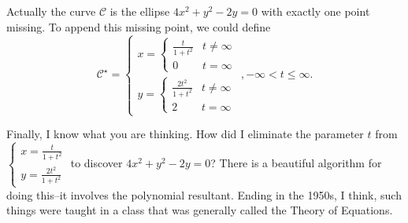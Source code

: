 \documentclass[12pt,answers,fleqn]{exam}
\begin{document}
\begin{questions}
\begin{parts}
\begin{solution}[3.5in]
\quad Actually the curve $\mathcal{C}$ is the ellipse $4 x^2 + y^2 - 2 y = 0$
with exactly one point missing.  To append this missing point, we could define
\begin{equation*}
  \mathcal{C}^\star = 
  \begin{cases} x =  \begin{cases} \frac{t}{1+t^2} & t \neq \infty \\
                                  0 & t = \infty 
                     \end{cases} \\ 
              y = \begin{cases}  \frac{2t^2}{1+ t^2} & t \neq \infty \\
                                  2 & t = \infty
              \end{cases}
              \end{cases},  
  -\infty < t \leq \infty.
\end{equation*}

\quad Finally, I know what you are thinking.  How did I eliminate the parameter $t$ from  $\begin{cases} x =  \frac{t}{1+t^2} \\ y = \frac{2t^2}{1+ t^2} 
\end{cases}$ to discover $4 x^2 + y^2 - 2 y = 0$?  There is a beautiful algorithm for doing this--it involves the polynomial
resultant. Ending in the 1950s, I think, such things were taught in a class that was generally called the Theory of Equations.


\end{solution}

\end{parts}
\end{questions}
    
\end{document}
